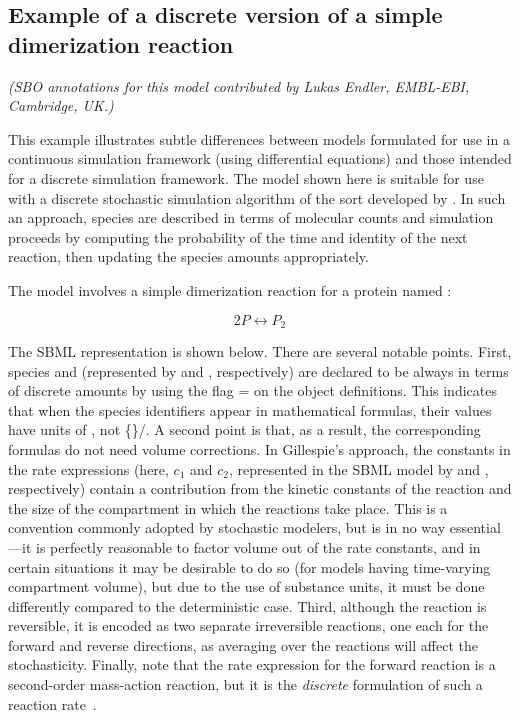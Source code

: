 

\subsection{Example of a discrete version of a simple dimerization reaction}
\label{sec:discrete-eg}

\emph{(SBO annotations for this model contributed by Lukas Endler,
  EMBL-EBI, Cambridge, UK.)}

This example illustrates subtle differences between models
formulated for use in a continuous simulation framework (\eg using
differential equations) and those intended for a discrete
simulation framework.  The model shown here is suitable for use
with a discrete stochastic simulation algorithm of the sort
developed by \cite{gillespie:1977}.  In such an approach, species
are described in terms of molecular counts and simulation
proceeds by computing the probability of the time and identity of
the next reaction, then updating the species amounts
appropriately.

The model involves a simple dimerization reaction for a protein
named :
\begin{linenomath}
\begin{equation*}
    2 P  \leftrightarrow  P_2
\end{equation*}
\end{linenomath}
The SBML representation is shown below.  There are several notable
points.  First, species  and  (represented
by  and , respectively) are declared to be always
in terms of discrete amounts by using the flag
= on the \Species object
definitions.  This indicates that when the species identifiers
appear in mathematical formulas, their values have units of
, not \{\}/.  A second point is that, as a result,
the corresponding \KineticLaw formulas do not need volume
corrections.  In Gillespie's approach, the constants in the rate
expressions (here, $c_1$ and $c_2$, represented in the SBML model
by  and , respectively) contain a contribution
from the kinetic constants of the reaction and the size of the
compartment in which the reactions take place.  This is a
convention commonly adopted by stochastic modelers, but is in no
way essential---it is perfectly reasonable to factor volume out of
the rate constants, and in certain situations it may be desirable
to do so (\eg for models having time-varying compartment volume),
but due to the use of substance units, it must be done differently
compared to the deterministic case.  Third, although the reaction
is reversible, it is encoded as two separate irreversible
reactions, one each for the forward and reverse directions, as
averaging over the reactions will affect the stochasticity.
Finally, note that the rate expression for the forward reaction is
a second-order mass-action reaction, but it is the \emph{discrete}
formulation of such a reaction rate~\citep{gillespie:1977}.

